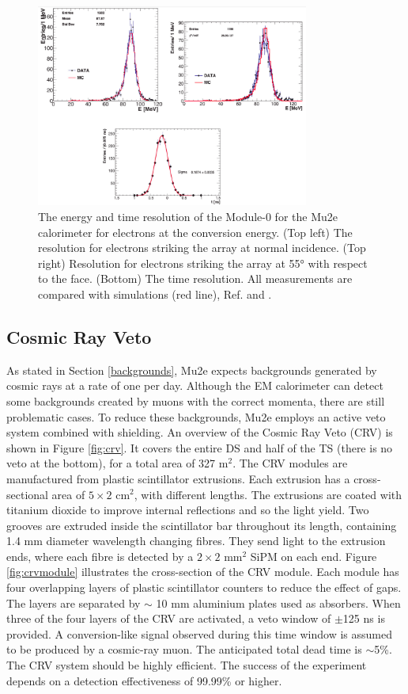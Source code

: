 \begin{figure}[!h]
    \centering
    \includegraphics[width =0.8\textwidth]{figures/png/Screenshot_20240330_105520.png}
    \caption{The energy and time resolution of the Module-0 for the Mu2e calorimeter for electrons at the conversion energy. (Top left) The resolution for electrons striking the
    array at normal incidence. (Top right) Resolution for electrons striking the array at 55° with respect to the face. (Bottom) The time resolution. 
    All measurements are compared with simulations (red line), Ref. \cite{bobbb} and \cite{calo95}.}
                \label{fig:calores}
                \end{figure}
\subsection{Cosmic Ray Veto}\label{CRV}
As stated in Section \ref{backgrounds}, Mu2e expects backgrounds generated by cosmic rays 
at a rate of one per day. Although the EM calorimeter can detect some backgrounds created 
by muons with the correct momenta, there are still problematic cases. To reduce these 
backgrounds, Mu2e employs an active veto system combined with shielding. An overview 
of the Cosmic Ray Veto (CRV) is shown in Figure \ref{fig:crv}. It covers the entire 
DS and half of the TS (there is no veto at the bottom), for a total area of 327 m$^2$.
The CRV modules are manufactured from plastic scintillator extrusions. Each extrusion 
has a cross-sectional area of $5 \times 2$ cm$^2$, with different lengths. The extrusions 
are coated with titanium dioxide to improve internal reflections and so the light yield. 
Two grooves are extruded inside the scintillator bar throughout its length, containing 
1.4 mm diameter wavelength changing fibres. They send light to the extrusion ends, 
where each fibre is detected by a $2 \times 2$ mm$^2$ SiPM on each end. Figure \ref{fig:crvmodule} 
illustrates the cross-section of the CRV module. Each module has four overlapping layers of plastic 
scintillator counters to reduce the effect of gaps. The layers are separated by $\sim$ 10 mm aluminium 
plates used as absorbers. When three of the four layers of the CRV are activated, a veto window of $\pm$125 ns 
is provided. A conversion-like signal observed during this time window is assumed to be produced by a cosmic-ray muon. 
The anticipated total dead time is $\sim$5\%. The CRV system should be highly efficient. 
The success of the experiment depends on a detection effectiveness of 99.99\% or higher.

